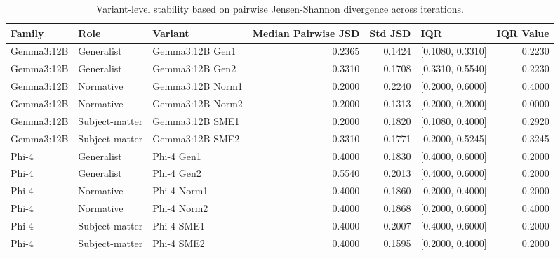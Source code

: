 \begin{table}
\caption{Variant-level stability based on pairwise Jensen-Shannon divergence across iterations.}
\label{tab:variant_stability_jsd}
\begin{tabular}{lllrrlr}
\toprule
Family & Role & Variant & Median Pairwise JSD & Std JSD & IQR & IQR Value \\
\midrule
Gemma3:12B & Generalist & Gemma3:12B Gen1 & 0.2365 & 0.1424 & [0.1080, 0.3310] & 0.2230 \\
Gemma3:12B & Generalist & Gemma3:12B Gen2 & 0.3310 & 0.1708 & [0.3310, 0.5540] & 0.2230 \\
Gemma3:12B & Normative & Gemma3:12B Norm1 & 0.2000 & 0.2240 & [0.2000, 0.6000] & 0.4000 \\
Gemma3:12B & Normative & Gemma3:12B Norm2 & 0.2000 & 0.1313 & [0.2000, 0.2000] & 0.0000 \\
Gemma3:12B & Subject-matter & Gemma3:12B SME1 & 0.2000 & 0.1820 & [0.1080, 0.4000] & 0.2920 \\
Gemma3:12B & Subject-matter & Gemma3:12B SME2 & 0.3310 & 0.1771 & [0.2000, 0.5245] & 0.3245 \\
Phi-4 & Generalist & Phi-4 Gen1 & 0.4000 & 0.1830 & [0.4000, 0.6000] & 0.2000 \\
Phi-4 & Generalist & Phi-4 Gen2 & 0.5540 & 0.2013 & [0.4000, 0.6000] & 0.2000 \\
Phi-4 & Normative & Phi-4 Norm1 & 0.4000 & 0.1860 & [0.2000, 0.4000] & 0.2000 \\
Phi-4 & Normative & Phi-4 Norm2 & 0.4000 & 0.1868 & [0.2000, 0.6000] & 0.4000 \\
Phi-4 & Subject-matter & Phi-4 SME1 & 0.4000 & 0.2007 & [0.4000, 0.6000] & 0.2000 \\
Phi-4 & Subject-matter & Phi-4 SME2 & 0.4000 & 0.1595 & [0.2000, 0.4000] & 0.2000 \\
\bottomrule
\end{tabular}
\end{table}

